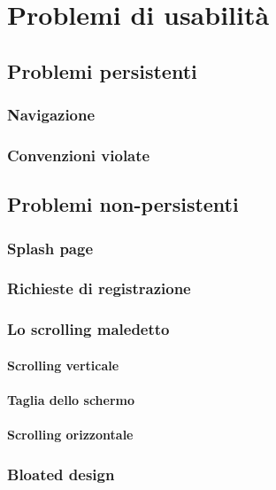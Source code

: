 
\section{Problemi di usabilità}

	\subsection{Problemi persistenti}
	
		\subsubsection{Navigazione}
		
		\subsubsection{Convenzioni violate}
	
	
	\subsection{Problemi non-persistenti}
	
		\subsubsection{Splash page}
		
		\subsubsection{Richieste di registrazione}
		
		\subsubsection{Lo scrolling maledetto}
			\paragraph{Scrolling verticale}
			\paragraph{Taglia dello schermo}
			\paragraph{Scrolling orizzontale}
		
		\subsubsection{Bloated design}
		
